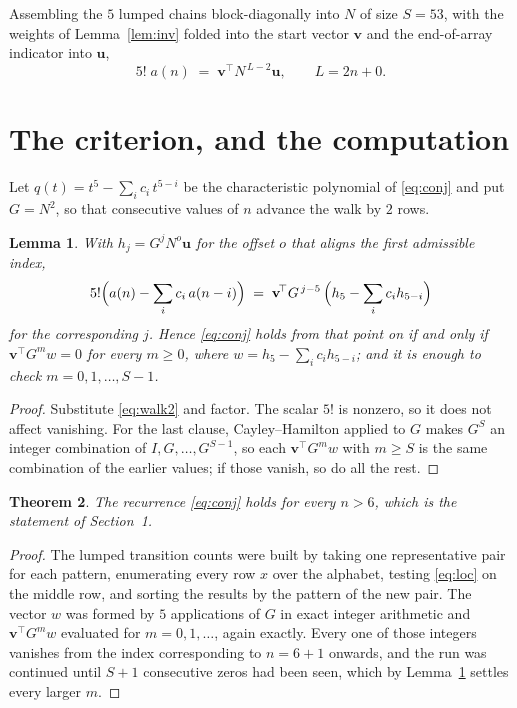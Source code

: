\documentclass[11pt,a4paper]{article}
\theoremstyle{plain}
\newtheorem{theorem}{Theorem}
\newtheorem{lemma}[theorem]{Lemma}
\theoremstyle{definition}
\begin{document}
Assembling the $5$ lumped chains block-diagonally into $N$ of size $S=53$, with the
weights of Lemma~\ref{lem:inv} folded into the start vector $\mathbf{v}$ and the
end-of-array indicator into $\mathbf{u}$,
\begin{equation}\label{eq:walk2}
5!\;a(n)\;=\;\mathbf{v}^{\!\top}N^{\,L-2}\mathbf{u},\qquad L=2n+0 .
\end{equation}

\section{The criterion, and the computation}

Let $q(t)=t^{5}-\sum_i c_i\,t^{5-i}$ be the characteristic polynomial of
\eqref{eq:conj} and put $G=N^{2}$, so that consecutive values of $n$ advance the
walk by $2$ rows.

\begin{lemma}\label{lem:crit}
With $h_j=G^{j}N^{o}\mathbf{u}$ for the offset $o$ that aligns the first admissible
index,
\[
5!\Bigl(a(n)-\sum_i c_i\,a(n-i)\Bigr)\;=\;\mathbf{v}^{\!\top}G^{\,j-5}\,
\Bigl(h_{5}-\sum_i c_i h_{5-i}\Bigr)
\]
for the corresponding $j$. Hence \eqref{eq:conj} holds from that point on if and only if
$\mathbf{v}^{\!\top}G^{m}w=0$ for every $m\ge0$, where
$w=h_{5}-\sum_i c_ih_{5-i}$; and it is enough to check $m=0,1,\dots,S-1$.
\end{lemma}

\begin{proof}
Substitute \eqref{eq:walk2} and factor. The scalar $5!$ is nonzero, so it does not
affect vanishing. For the last clause, Cayley--Hamilton applied to $G$ makes $G^{S}$ an
integer combination of $I,G,\dots,G^{S-1}$, so each $\mathbf{v}^{\!\top}G^{m}w$ with
$m\ge S$ is the same combination of the earlier values; if those vanish, so do all the rest.
\end{proof}

\begin{theorem}
The recurrence \eqref{eq:conj} holds for every $n>6$, which is the statement of
Section~1.
\end{theorem}

\begin{proof}
The lumped transition counts were built by taking one representative pair for each pattern,
enumerating every row $x$ over the alphabet, testing \eqref{eq:loc} on the middle
row, and sorting the results by the pattern of the new pair. The vector $w$ was formed by
$5$ applications of $G$ in exact integer arithmetic and $\mathbf{v}^{\!\top}G^{m}w$
evaluated for $m=0,1,\dots$, again exactly. Every one of those integers vanishes from the
index corresponding to $n=6+1$ onwards, and the run was continued until $S+1$
consecutive zeros had been seen, which by Lemma~\ref{lem:crit} settles every larger $m$.
\end{proof}
\end{document}
